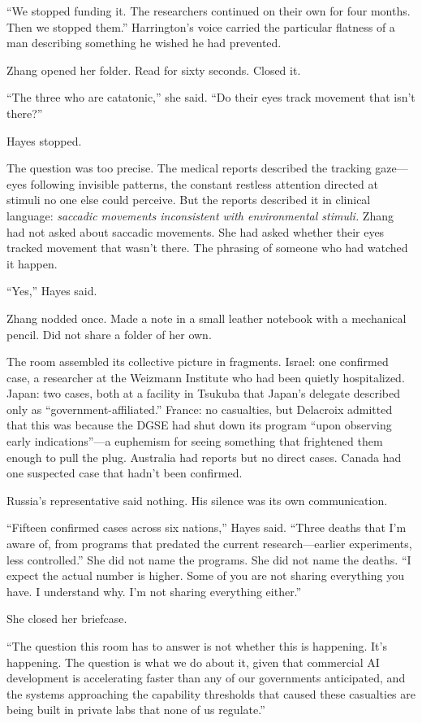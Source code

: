 ``We stopped funding it. The researchers continued on their own for four months. Then we stopped them.'' Harrington's voice carried the particular flatness of a man describing something he wished he had prevented.

Zhang opened her folder. Read for sixty seconds. Closed it.

``The three who are catatonic,'' she said. ``Do their eyes track movement that isn't there?''

Hayes stopped.

The question was too precise. The medical reports described the tracking gaze---eyes following invisible patterns, the constant restless attention directed at stimuli no one else could perceive. But the reports described it in clinical language: \textit{saccadic movements inconsistent with environmental stimuli.} Zhang had not asked about saccadic movements. She had asked whether their eyes tracked movement that wasn't there. The phrasing of someone who had watched it happen.

``Yes,'' Hayes said.

Zhang nodded once. Made a note in a small leather notebook with a mechanical pencil. Did not share a folder of her own.

The room assembled its collective picture in fragments. Israel: one confirmed case, a researcher at the Weizmann Institute who had been quietly hospitalized. Japan: two cases, both at a facility in Tsukuba that Japan's delegate described only as ``government-affiliated.'' France: no casualties, but Delacroix admitted that this was because the DGSE had shut down its program ``upon observing early indications''---a euphemism for seeing something that frightened them enough to pull the plug. Australia had reports but no direct cases. Canada had one suspected case that hadn't been confirmed.

Russia's representative said nothing. His silence was its own communication.

``Fifteen confirmed cases across six nations,'' Hayes said. ``Three deaths that I'm aware of, from programs that predated the current research---earlier experiments, less controlled.'' She did not name the programs. She did not name the deaths. ``I expect the actual number is higher. Some of you are not sharing everything you have. I understand why. I'm not sharing everything either.''

She closed her briefcase.

``The question this room has to answer is not whether this is happening. It's happening. The question is what we do about it, given that commercial AI development is accelerating faster than any of our governments anticipated, and the systems approaching the capability thresholds that caused these casualties are being built in private labs that none of us regulate.''

